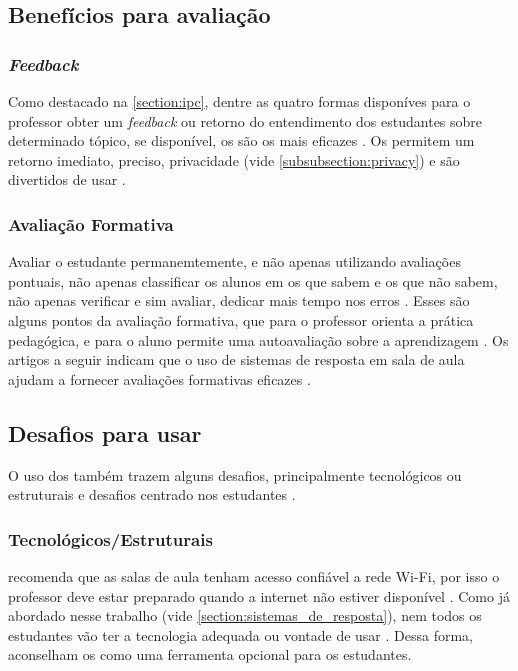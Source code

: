 \subsection{Benefícios para avaliação}

\subsubsection{\textit{Feedback}}
Como destacado na \autoref{section:ipc}, dentre as quatro formas disponíves para
o professor obter um \textit{feedback} ou retorno do entendimento dos estudantes
sobre determinado tópico, se disponível, os {\clickers} são os mais eficazes \cite{Crouch2007}.
Os {\clickers} permitem um retorno imediato, preciso, privacidade (vide \autoref{subsubsection:privacy}) e
são divertidos de usar \cite{Rana2016, Blood2013, Caldwell2007}.

\subsubsection{Avaliação Formativa}
Avaliar o estudante permanemtemente, e não apenas utilizando avaliações pontuais,
não apenas classificar os alunos em os que sabem e os que não sabem, não apenas
verificar e sim avaliar, dedicar mais tempo nos erros \cite{UnivespTV2013}. Esses são alguns pontos
da avaliação formativa, que para o professor orienta a prática pedagógica, e para
o aluno permite uma autoavaliação sobre a aprendizagem \cite{Kay2009}. Os artigos
a seguir indicam que o uso de sistemas de resposta em sala de aula ajudam a
fornecer avaliações formativas eficazes \cite{Kortemeyer2016, Thampy2014, Kay2009, Fies2006}.

\subsection{Desafios para usar {\clickers}}
O uso dos {\clickers} também trazem alguns desafios, principalmente
tecnológicos ou estruturais e desafios centrado nos estudantes \cite{Cubric2015, Kay2009}.

\subsubsection{Tecnológicos/Estruturais}
 recomenda que as salas de aula tenham acesso confiável
a rede Wi-Fi, por isso o professor deve estar preparado quando a internet não
estiver disponível \cite{Strasser2010}. Como já abordado nesse trabalho (vide \autoref{section:sistemas_de_resposta}),
nem todos os estudantes vão ter a tecnologia adequada ou vontade de usar \cite{Morrell2015, Stowell2015}.
Dessa forma,  aconselham os {\clickers} como uma ferramenta opcional para
os estudantes.

